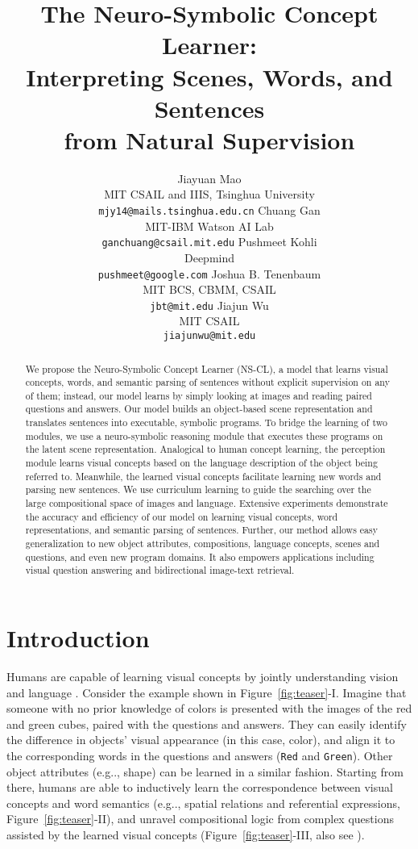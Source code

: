 \documentclass{article} \usepackage{iclr2019_conference,times}
\title{The Neuro-Symbolic Concept Learner:\\Interpreting Scenes, Words, and Sentences\\from Natural Supervision}
\author{Jiayuan Mao \\
MIT CSAIL and IIIS, Tsinghua University\\
\texttt{mjy14@mails.tsinghua.edu.cn}
\And
Chuang Gan\\
MIT-IBM Watson AI Lab\\
\texttt{ganchuang@csail.mit.edu}
\And
Pushmeet Kohli\\
Deepmind\\
\texttt{pushmeet@google.com}
\And
Joshua B. Tenenbaum\\
MIT BCS, CBMM, CSAIL\\
\texttt{jbt@mit.edu}
\And
Jiajun Wu\\
MIT CSAIL\\
\texttt{jiajunwu@mit.edu}
}
\makeatletter
\newcommand{\fig}[1]{Figure~\ref{#1}}
\DeclareRobustCommand\onedot{\futurelet\@let@token\@onedot}
\def\@onedot{\ifx\@let@token.\else.\null\fi\xspace}
\def\eg{e.g\onedot} \def\Eg{E.g\onedot}
\makeatother
\begin{document}
\maketitle

\begin{abstract}
We propose the Neuro-Symbolic Concept Learner (NS-CL), a model that learns visual concepts, words, and semantic parsing of sentences without explicit supervision on any of them; instead, our model learns by simply looking at images and reading paired questions and answers. Our model builds an object-based scene representation and translates sentences into executable, symbolic programs. To bridge the learning of two modules, we use a neuro-symbolic reasoning module that executes these programs on the latent scene representation. Analogical to human concept learning, the perception module learns visual concepts based on the language description of the object being referred to. Meanwhile, the learned visual concepts facilitate learning new words and parsing new sentences. We use curriculum learning to guide the searching over the large compositional space of images and language. Extensive experiments demonstrate the accuracy and efficiency of our model on learning visual concepts, word representations, and semantic parsing of sentences. Further, our method allows easy generalization to new object attributes, compositions, language concepts, scenes and questions, and even new program domains. It also empowers applications including visual question answering and bidirectional image-text retrieval. 
\end{abstract}

\section{Introduction}



Humans are capable of learning visual concepts by jointly understanding vision and language \citep{fazly2010probabilistic,chrupala2015learning,gauthier2018word}.
Consider the example shown in \fig{fig:teaser}-I. Imagine that someone with no prior knowledge of colors is presented with the images of the red and green cubes, paired with the questions and answers. They can easily identify the difference in objects' visual appearance (in this case, color), and align it to the corresponding words in the questions and answers (\texttt{Red} and \texttt{Green}). Other object attributes (\eg, shape) can be learned in a similar fashion. Starting from there, humans are able to inductively learn the correspondence between visual concepts and word semantics (\eg, spatial relations and referential expressions, \fig{fig:teaser}-II), and unravel compositional logic from complex questions assisted by the learned visual concepts (\fig{fig:teaser}-III, also see \cite{abend2017bootstrapping}). 
\end{document}
